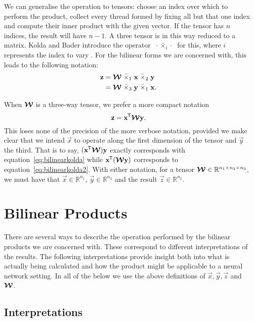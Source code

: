 We can generalise the operation to tensors: choose an index over which to perform the product,
collect every thread formed by fixing all but that one index and compute their inner product with the
given vector. If the tensor has \(n\) indices, the result will have \(n-1\). A three tensor is in
this way reduced to a matrix. Kolda and Bader introduce the operator
 \(\;\cdot \bar{\times}_i \cdot\;\)
for this, where \(i\) represents the index to vary \autocite{Kolda2009}. For the bilinear forms
we are concerned with, this leads to the following notation:
\begin{align}
	\mathbf{z} &= \bm{\mathcal{W}} \;\bar{\times}_1\; \mathbf{x}\; \bar{\times}_2\; \mathbf{y} 
	\label{eq:bilinearkolda} \\
	&= \bm{\mathcal{W}} \; \bar{\times}_3\; \mathbf{y}\; \bar{\times}_1\; \mathbf{x}.
	\label{eq:bilinearkolda2}
\end{align}

When \(\bm{\mathcal{W}}\) is a three-way tensor, we prefer a more compact notation
\begin{equation}\label{eq:bilintensor}
	\mathbf{z} = \mathbf{x}^{\mkern-1.5mu\mathsf{T}}\bm{\mathcal{W}}\mathbf{y}.
\end{equation} This loses none of the precision of the more verbose notation, provided we make clear
that we intend \(\vec{x}\) to operate along the first dimension of the tensor and \(\vec{y}\) the
third. That is to say, \((\mathbf{x}^{\mkern-1.5mu\mathsf{T}}\bm{\mathcal{W}})\mathbf{y}\) exactly corresponds with 
equation~\eqref{eq:bilinearkolda} while \(\mathbf{x}^{\mkern-1.5mu\mathsf{T}}(\bm{\mathcal{W}}\mathbf{y})\) corresponds to
equation~\eqref{eq:bilinearkolda2}. With either notation, for a tensor 
\(\bm{\mathcal{W}} \in \mathbb{R}^{n_1 \times n_2 \times n_3}\), we must have that 
\(\vec{x}\in \mathbb{R}^{n_1}\), \(\vec{y} \in \mathbb{R}^{n_3}\) and the result 
\(\vec{z}\in\mathbb{R}^{n_2}\).

\section{Bilinear Products}
There are several ways to describe the operation performed by the bilinear products we are
concerned with. These correspond to different interpretations of the results. The following
interpretations provide insight both into what is actually being calculated and how the product might
be applicable to a neural network setting. In all of the below we use the above definitions of
\(\vec{x}, \vec{y}, \vec{z}\) and \(\bm{\mathcal{W}}\).

\subsection{Interpretations}
